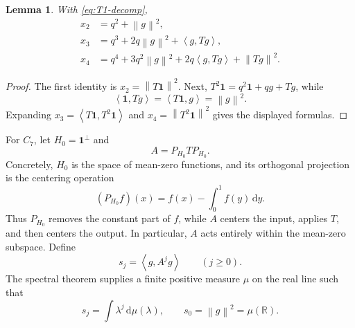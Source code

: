 \documentclass[11pt]{article}
\newtheorem{lemma}[theorem]{Lemma}
\newcommand{\one}{\mathbf 1}
\newcommand{\R}{\mathbb R}
\newcommand{\ip}[2]{\left\langle #1,#2\right\rangle}
\newcommand{\norm}[1]{\left\lVert #1\right\rVert}
\newcommand{\dd}{\,\mathrm d}
\begin{document}
\begin{lemma}\label{lem:path-to-4}
With \eqref{eq:T1-decomp},
\[
\begin{aligned}
 x_2&=q^2+\norm g^2,\\
 x_3&=q^3+2q\norm g^2+\ip g{Tg},\\
 x_4&=q^4+3q^2\norm g^2+2q\ip g{Tg}+\norm{Tg}^2.
\end{aligned}
\]
\end{lemma}

\begin{proof}
The first identity is \(x_2=\norm{T\one}^2\).  Next,
\(T^2\one=q^2\one+qg+Tg\), while
\[
       \ip{\one}{Tg}=\ip{T\one}{g}=\norm g^2.
\]
Expanding \(x_3=\ip{T\one}{T^2\one}\) and
\(x_4=\norm{T^2\one}^2\) gives the displayed formulas.
\end{proof}

For \(C_7\), let \(H_0=\one^\perp\) and
\[
       A=P_{H_0}TP_{H_0}.
\]
Concretely, \(H_0\) is the space of mean-zero functions, and its orthogonal
projection is the centering operation
\[
       (P_{H_0}f)(x)=f(x)-\int_0^1f(y)\dd y.
\]
Thus \(P_{H_0}\) removes the constant part of \(f\), while \(A\) centers the
input, applies \(T\), and then centers the output.  In particular, \(A\) acts
entirely within the mean-zero subspace.
Define
\begin{equation}\label{eq:sj-def}
       s_j=\ip g{A^jg}\qquad(j\ge0).
\end{equation}
The spectral theorem supplies a finite positive measure \(\mu\) on the real
line such that
\[
       s_j=\int\lambda^j\dd\mu(\lambda),
       \qquad s_0=\norm g^2=\mu(\R).
\]
\end{document}
